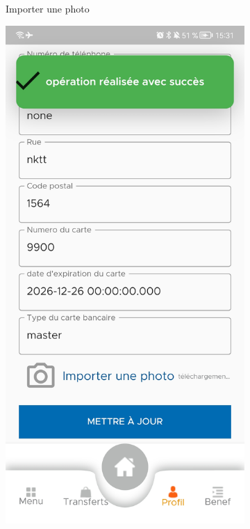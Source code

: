 \begin{itemize}[label=$\ast$]
\begin{figure}
\begin{subfigure}[b]{0.3\textwidth}
		\caption{Importer une photo}
		\label{fig:five over x}
	\end{subfigure}
\newline
	\centering
\begin{subfigure}{0.3\textwidth}
	\includegraphics[width=\hsize, valign=m ]{./Template LaTeX/Images/9.jpg}

\end{subfigure}
\end{figure}
\end{itemize}
